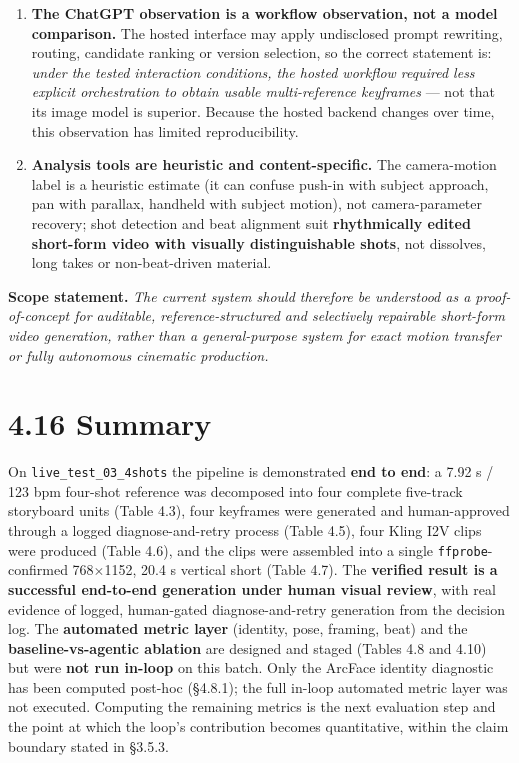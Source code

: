 \documentclass[10pt,twocolumn,letterpaper]{article}
\begin{document}
\begin{enumerate}[leftmargin=1.4em,itemsep=2pt,topsep=2pt]

\item \textbf{The ChatGPT observation is a workflow observation, not a model comparison.} The hosted interface may apply undisclosed prompt rewriting, routing, candidate ranking or version selection, so the correct statement is: \emph{under the tested interaction conditions, the hosted workflow required less explicit orchestration to obtain usable multi-reference keyframes} --- not that its image model is superior. Because the hosted backend changes over time, this observation has limited reproducibility.

\item \textbf{Analysis tools are heuristic and content-specific.} The camera-motion label is a heuristic estimate (it can confuse push-in with subject approach, pan with parallax, handheld with subject motion), not camera-parameter recovery; shot detection and beat alignment suit \textbf{rhythmically edited short-form video with visually distinguishable shots}, not dissolves, long takes or non-beat-driven material.

\end{enumerate}

\textbf{Scope statement.} \emph{The current system should therefore be understood as a proof-of-concept for auditable, reference-structured and selectively repairable short-form video generation, rather than a general-purpose system for exact motion transfer or fully autonomous cinematic production.}


\section*{4.16 Summary}

On \texttt{live\_test\_03\_4shots} the pipeline is demonstrated \textbf{end to end}: a 7.92 s / 123 bpm four-shot reference was decomposed into four complete five-track storyboard units (Table 4.3), four keyframes were generated and human-approved through a logged diagnose-and-retry process (Table 4.5), four Kling I2V clips were produced (Table 4.6), and the clips were assembled into a single \texttt{ffprobe}-confirmed 768$\times$1152, 20.4 s vertical short (Table 4.7). The \textbf{verified result is a successful end-to-end generation under human visual review}, with real evidence of logged, human-gated diagnose-and-retry generation from the decision log. The \textbf{automated metric layer} (identity, pose, framing, beat) and the \textbf{baseline-vs-agentic ablation} are designed and staged (Tables 4.8 and 4.10) but were \textbf{not run in-loop} on this batch. Only the ArcFace identity diagnostic has been computed post-hoc (\S{}4.8.1); the full in-loop automated metric layer was not executed. Computing the remaining metrics is the next evaluation step and the point at which the loop's contribution becomes quantitative, within the claim boundary stated in \S{}3.5.3.
\end{document}
